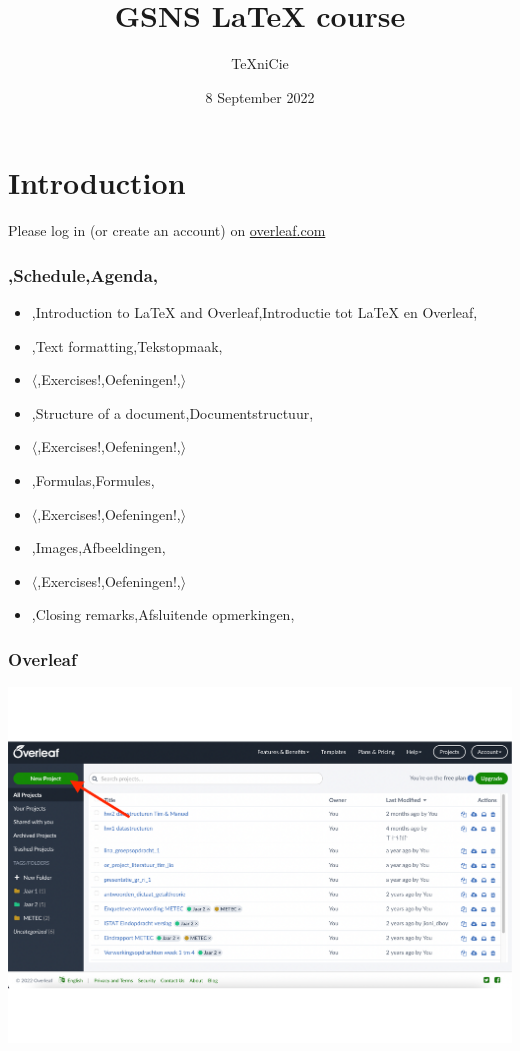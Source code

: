 \documentclass{../../cursuspresentatie}
\title{GSNS \LaTeX{} course}
\author{\TeX niCie}
\date{8 September 2022}
\begin{document}
\section{Introduction}

\begin{frame}
	\titlepage
	\centering

	Please log in (or create an account) on \url{overleaf.com}
\end{frame}

\begin{frame}
	\frametitle{\lang,Schedule,Agenda,}
	
	\begin{itemize}
		\item \lang,Introduction to LaTeX and Overleaf,Introductie tot LaTeX en Overleaf,
		\item \lang,Text formatting,Tekstopmaak,
		\item  $ \langle $\lang,Exercises!,Oefeningen!,$ \rangle $
		\item \lang,Structure of a document,Documentstructuur,
		\item $ \langle $\lang,Exercises!,Oefeningen!,$ \rangle $
		\item \lang,Formulas,Formules,
		\item $ \mathbf\langle $\lang,Exercises!,Oefeningen!,$ \rangle $
		\item  \lang,Images,Afbeeldingen,
		\item $ \mathbf\langle $\lang,Exercises!,Oefeningen!,$ \rangle $
		\item \lang,Closing remarks,Afsluitende opmerkingen,
	\end{itemize}
\end{frame}

\begin{frame}
	\frametitle{Overleaf}
	\includegraphics[width=1\textwidth]{images/overleaf_startscherm}
\end{frame}
\end{document}

